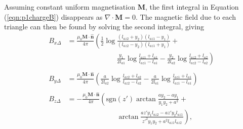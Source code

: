 Assuming constant uniform magnetisation \(\mathbf{M}\), the first integral in Equation (\ref{eqn:p1chargeB}) disappears as \(\nabla \cdot \mathbf{M}=0\). The magnetic field due to each triangle can then be found by solving the second integral, giving
\begin{align}\label{eqn:p1trieqns}
    B_{x\Delta} &= \frac{\mu_0 \mathbf{M} \cdot \mathbf{\hat{n}}}{4\pi} \left( \frac{1}{2}\log\frac{\left( l_{az2}+y_2\right)\left(l_{az1}-y_1\right)}{\left(l_{az2}-y_2\right)\left(l_{az1}+y_1\right)} + \right. \nonumber \\
	& \quad \quad \quad \quad \quad \quad \quad \left. \frac{y_1}{2l_{a1}} \log \frac{l_{az1}+l_{a1}}{l_{az1}-l_{a1}} - \frac{y_2}{2l_{a2}} \log \frac{l_{az2}+l_{a2}}{l_{az2}-l_{a2}} \right) \nonumber \\
    & \quad \nonumber \\
	B_{y\Delta} &= \frac{\mu_0 \mathbf{M} \cdot \mathbf{\hat{n}}}{4\pi} \left( \frac{a}{2l_{a2}} \log \frac{l_{az2}+l_{a2}}{l_{az2}-l_{a2}} - \frac{a}{2l_{a1}} \log \frac{l_{az1}+l_{a1}}{l_{az1}-l_{a1}} \right) \\
    & \quad \nonumber \\
	B_{z\Delta} &= -\frac{\mu_0 \mathbf{M} \cdot \mathbf{\hat{n}}}{4\pi} \left( \text{sgn} \left( z' \right) \arctan \frac{ay_2-ay_1}{y_1y_2+a^2} + \right. \nonumber \\
	& \quad \quad \quad \quad \quad \quad \quad \left. \arctan \frac{az'y_1l_{az2}-az'y_2l_{az1}}{z'^2y_1y_2+a^2l_{az1}l_{az2}} \right)  \text{,} \nonumber
\end{align}
